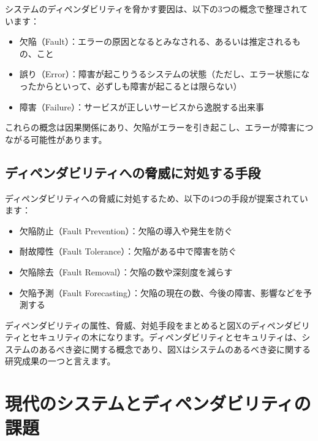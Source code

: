 システムのディペンダビリティを脅かす要因は、以下の3つの概念で整理されています：

\begin{itemize}
\item 欠陥（Fault）：エラーの原因となるとみなされる、あるいは推定されるもの、こと
\item 誤り（Error）：障害が起こりうるシステムの状態（ただし、エラー状態になったからといって、必ずしも障害が起こるとは限らない）
\item 障害（Failure）：サービスが正しいサービスから逸脱する出来事
\end{itemize}

これらの概念は因果関係にあり、欠陥がエラーを引き起こし、エラーが障害につながる可能性があります。

\subsection{ディペンダビリティへの脅威に対処する手段}

ディペンダビリティへの脅威に対処するため、以下の4つの手段が提案されています：
\begin{itemize}
\item 欠陥防止（Fault Prevention）：欠陥の導入や発生を防ぐ
\item 耐故障性（Fault Tolerance）：欠陥がある中で障害を防ぐ
\item 欠陥除去（Fault Removal）：欠陥の数や深刻度を減らす
\item 欠陥予測（Fault Forecasting）：欠陥の現在の数、今後の障害、影響などを予測する
\end{itemize}

ディペンダビリティの属性、脅威、対処手段をまとめると図Xのディペンダビリティとセキュリティの木になります。ディペンダビリティとセキュリティは、システムのあるべき姿に関する概念であり、図Xはシステムのあるべき姿に関する研究成果の一つと言えます。



\section{現代のシステムとディペンダビリティの課題}

